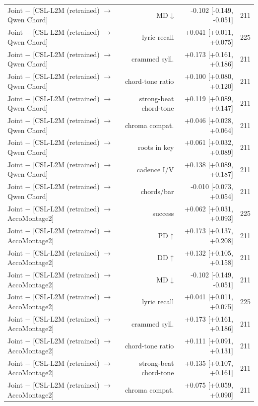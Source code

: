 \begin{table}[t]
\begin{tabular}{lrrr}
Joint $-$ [CSL-L2M (retrained) $\rightarrow$ Qwen Chord] & MD ↓ & -0.102 [-0.149, -0.051] & 211 \\
Joint $-$ [CSL-L2M (retrained) $\rightarrow$ Qwen Chord] & lyric recall & +0.041 [+0.011, +0.075] & 225 \\
Joint $-$ [CSL-L2M (retrained) $\rightarrow$ Qwen Chord] & crammed syll. & +0.173 [+0.161, +0.186] & 211 \\
Joint $-$ [CSL-L2M (retrained) $\rightarrow$ Qwen Chord] & chord-tone ratio & +0.100 [+0.080, +0.120] & 211 \\
Joint $-$ [CSL-L2M (retrained) $\rightarrow$ Qwen Chord] & strong-beat chord-tone & +0.119 [+0.089, +0.147] & 211 \\
Joint $-$ [CSL-L2M (retrained) $\rightarrow$ Qwen Chord] & chroma compat. & +0.046 [+0.028, +0.064] & 211 \\
Joint $-$ [CSL-L2M (retrained) $\rightarrow$ Qwen Chord] & roots in key & +0.061 [+0.032, +0.089] & 211 \\
Joint $-$ [CSL-L2M (retrained) $\rightarrow$ Qwen Chord] & cadence I/V & +0.138 [+0.089, +0.187] & 211 \\
Joint $-$ [CSL-L2M (retrained) $\rightarrow$ Qwen Chord] & chords/bar & -0.010 [-0.073, +0.054] & 211 \\
Joint $-$ [CSL-L2M (retrained) $\rightarrow$ AccoMontage2] & success & +0.062 [+0.031, +0.093] & 225 \\
Joint $-$ [CSL-L2M (retrained) $\rightarrow$ AccoMontage2] & PD ↑ & +0.173 [+0.137, +0.208] & 211 \\
Joint $-$ [CSL-L2M (retrained) $\rightarrow$ AccoMontage2] & DD ↑ & +0.132 [+0.105, +0.158] & 211 \\
Joint $-$ [CSL-L2M (retrained) $\rightarrow$ AccoMontage2] & MD ↓ & -0.102 [-0.149, -0.051] & 211 \\
Joint $-$ [CSL-L2M (retrained) $\rightarrow$ AccoMontage2] & lyric recall & +0.041 [+0.011, +0.075] & 225 \\
Joint $-$ [CSL-L2M (retrained) $\rightarrow$ AccoMontage2] & crammed syll. & +0.173 [+0.161, +0.186] & 211 \\
Joint $-$ [CSL-L2M (retrained) $\rightarrow$ AccoMontage2] & chord-tone ratio & +0.111 [+0.091, +0.131] & 211 \\
Joint $-$ [CSL-L2M (retrained) $\rightarrow$ AccoMontage2] & strong-beat chord-tone & +0.135 [+0.107, +0.161] & 211 \\
Joint $-$ [CSL-L2M (retrained) $\rightarrow$ AccoMontage2] & chroma compat. & +0.075 [+0.059, +0.090] & 211 \\

\end{tabular}
\end{table}
